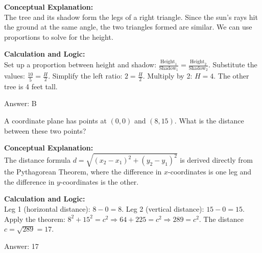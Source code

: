 \documentclass[11pt,paper=a4,answers]{exam}
\begin{document}
\begin{questions}
\begin{solution}
\textbf{Conceptual Explanation:} \\
The tree and its shadow form the legs of a right triangle. Since the sun's rays hit the ground at the same angle, the two triangles formed are similar. We can use proportions to solve for the height.

\vspace{30pt}

\textbf{Calculation and Logic:} \\
Set up a proportion between height and shadow: $\frac{\text{Height}_1}{\text{Shadow}_1} = \frac{\text{Height}_2}{\text{Shadow}_2}$. Substitute the values: $\frac{10}{5} = \frac{H}{2}$. Simplify the left ratio: $2 = \frac{H}{2}$. Multiply by 2: $H = 4$. The other tree is 4 feet tall.

\vspace{30pt}

Answer: \colorbox{yellow!100}{B}
\end{solution}

\vspace{60pt}

\question
A coordinate plane has points at $(0,0)$ and $(8,15)$. What is the distance between these two points?

\begin{solution}
\textbf{Conceptual Explanation:} \\
The distance formula $d = \sqrt{(x_2-x_1)^2 + (y_2-y_1)^2}$ is derived directly from the Pythagorean Theorem, where the difference in $x$-coordinates is one leg and the difference in $y$-coordinates is the other.

\vspace{30pt}

\textbf{Calculation and Logic:} \\
Leg 1 (horizontal distance): $8 - 0 = 8$. Leg 2 (vertical distance): $15 - 0 = 15$. Apply the theorem: $8^2 + 15^2 = c^2 \Rightarrow 64 + 225 = c^2 \Rightarrow 289 = c^2$. The distance $c = \sqrt{289} = 17$.

\vspace{30pt}

Answer: \colorbox{yellow!100}{17}
\end{solution}

\vspace{60pt}


\end{questions}
\end{document}
